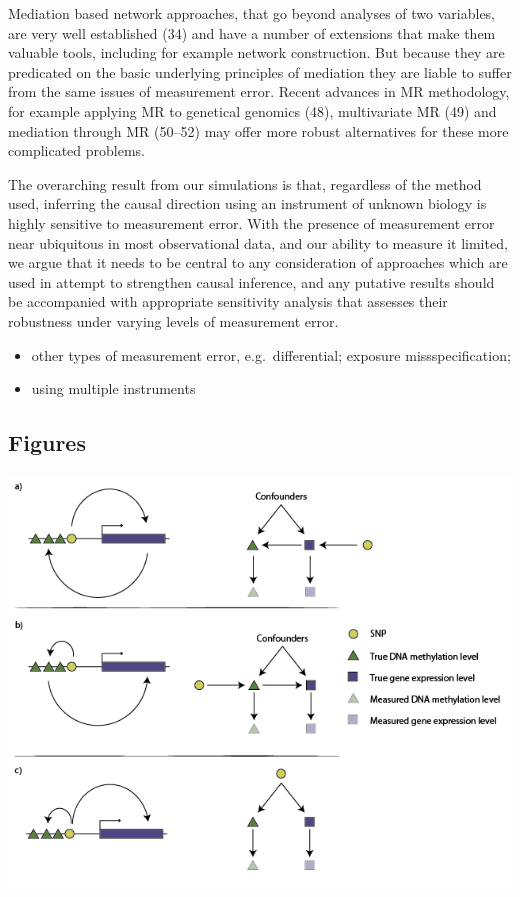 \documentclass[]{article}
\providecommand{\tightlist}{%
  \setlength{\itemsep}{0pt}\setlength{\parskip}{0pt}}
\begin{document}
Mediation based network approaches, that go beyond analyses of two
variables, are very well established (34) and have a number of
extensions that make them valuable tools, including for example network
construction. But because they are predicated on the basic underlying
principles of mediation they are liable to suffer from the same issues
of measurement error. Recent advances in MR methodology, for example
applying MR to genetical genomics (48), multivariate MR (49) and
mediation through MR (50--52) may offer more robust alternatives for
these more complicated problems.

The overarching result from our simulations is that, regardless of the
method used, inferring the causal direction using an instrument of
unknown biology is highly sensitive to measurement error. With the
presence of measurement error near ubiquitous in most observational
data, and our ability to measure it limited, we argue that it needs to
be central to any consideration of approaches which are used in attempt
to strengthen causal inference, and any putative results should be
accompanied with appropriate sensitivity analysis that assesses their
robustness under varying levels of measurement error.

\begin{itemize}
\tightlist
\item
  other types of measurement error, e.g.~differential; exposure
  missspecification;
\item
  using multiple instruments
\end{itemize}

\newpage

\subsection{Figures}\label{figures}

\includegraphics{../images/dag-01.png}
\end{document}
